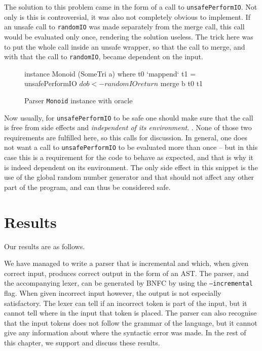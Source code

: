 \documentclass[a4paper,12pt,notitlepage]{report}
\renewcommand\cite{\citep}
\begin{document}
The solution to this problem came in the form of a call to
\texttt{unsafePerformIO}.  Not only is this is controversial, it was also not
completely obvious to implement. If an unsafe call to \texttt{randomIO} was made
separately from the merge call, this call would be evaluated only once,
rendering the solution useless. The trick here was to put the whole call inside
an unsafe wrapper, so that the call to merge, and with that the call to
\texttt{randomIO}, became dependent on the input.

\begin{figure}[H]
\begin{code}
instance Monoid (SomeTri a) where
    t0 `mappend` t1 = unsafePerformIO $ do
      b <- randomIO
      return $ merge b t0 t1
\end{code}
\caption{Parser \texttt{Monoid} instance with oracle}
\end{figure}

Now usually, for \texttt{unsafePerformIO} to be safe one should make sure that
the call is free from side effects and \textit{independent of its environment}.
\cite{unsafeHackage}. None of those two requirements are fulfilled here, so 
this calls for discussion. In general, one does not want a call to
\texttt{unsafePerformIO} to be evaluated more than once -- but in this case this
is a requirement for the code to behave as expected, and that is why it is indeed
dependent on its environment. The only side effect in this snippet is the use of
the global random number generator and that should not affect any other part of
the program, and can thus be considered safe.

%
%

\chapter{Results}
Our results are as follows.

We have managed to write a parser that is incremental and which, when given
correct input, produces correct output in the form of an AST. The parser, and
the accompanying lexer, can be generated by BNFC by using the
\texttt{---incremental} flag. When given incorrect input however, the output is
not especially satisfactory. The lexer can tell if an incorrect token is part of
the input, but it cannot tell where in the input that token is placed. The
parser can also recognise that the input tokens does not follow the grammar of
the language, but it cannot give any information about where the syntactic error
was made. In the rest of this chapter, we support and discuss these results. 
\end{document}
